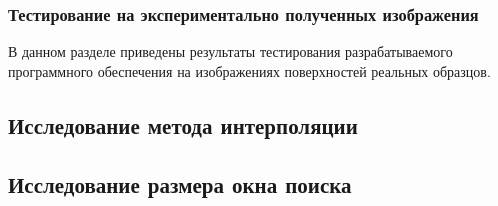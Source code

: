 \subsubsection{Тестирование на экспериментально полученных изображения}
В данном разделе приведены результаты тестирования разрабатываемого программного обеспечения на изображениях поверхностей реальных образцов.

\subsection{Исследование метода интерполяции}

\subsection{Исследование размера окна поиска}
